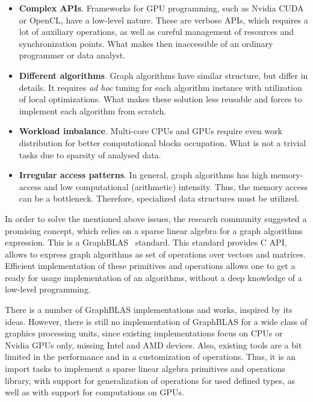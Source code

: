 \begin{itemize}
    \item \textbf{Complex APIs}. Frameworks for GPU programming, such as Nvidia CUDA or OpenCL, have a low-level nature. These are verbose APIs, which requires a lot of auxiliary operations, as well as careful management of resources and synchronization points. What makes then inaccessible of an ordinary programmer or data analyst.
    
    \item \textbf{Different algorithms}. Graph algorithms have similar structure, but differ in details. It requires \textit{ad hoc} tuning for each algorithm instance with utilization of local optimizations. What makes these solution less reusable and forces to implement each algorithm from scratch.
    
    \item \textbf{Workload imbalance}. Multi-core CPUs and GPUs require even work distribution for better computational blocks occupation. What is not a trivial tasks due to sparsity of analysed data.
    
    \item \textbf{Irregular access patterns}. In general, graph algorithms has high memory-access and low computational (arithmetic) intensity. Thus, the memory access can be a bottleneck. Therefore, specialized data structures must be utilized.
\end{itemize}

In order to solve the mentioned above issues, the research community suggested a promising concept, which relies on a sparse linear algebra for a graph algorithms expression. This is a GraphBLAS~\cite{paper:graphblas_foundations} standard. This standard provides C API, allows to express graph algorithms as set of operations over vectors and matrices. Efficient implementation of these primitives and operations allows one to get a ready for usage implementation of an algorithms, without a deep knowledge of a low-level programming.

There is a number of GraphBLAS implementations and works, inspired by its ideas. However, there is still no implementation of GraphBLAS for a wide class of graphics processing units, since existing implementations focus on CPUs or Nvidia GPUs only, missing Intel and AMD devices. Also, existing tools are a bit limited in the performance and in a customization of operations. Thus, it is an import tasks to implement a sparse linear algebra primitives and operations library, with support for generalization of operations for used defined types, as well as with support for computations on GPUs.